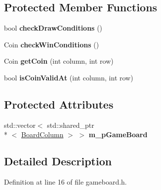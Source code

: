 \subsection*{Protected Member Functions}
\begin{DoxyCompactItemize}
\item 
\hypertarget{class_game_board_a9d39bb64647af701a265251624287807}{bool {\bfseries check\-Draw\-Conditions} ()}\label{class_game_board_a9d39bb64647af701a265251624287807}

\item 
\hypertarget{class_game_board_a2ac14f3ff1d653e086136792fe0933d6}{Coin {\bfseries check\-Win\-Conditions} ()}\label{class_game_board_a2ac14f3ff1d653e086136792fe0933d6}

\item 
\hypertarget{class_game_board_a15b19b2ec1e4c63b47e113aba42d3ae3}{Coin {\bfseries get\-Coin} (int column, int row)}\label{class_game_board_a15b19b2ec1e4c63b47e113aba42d3ae3}

\item 
\hypertarget{class_game_board_ae43c300f4bc9df8a8d65231f96d335dd}{bool {\bfseries is\-Coin\-Valid\-At} (int column, int row)}\label{class_game_board_ae43c300f4bc9df8a8d65231f96d335dd}

\end{DoxyCompactItemize}
\subsection*{Protected Attributes}
\begin{DoxyCompactItemize}
\item 
\hypertarget{class_game_board_a62a11c93b4a0af85d3613351ac323485}{std\-::vector$<$ std\-::shared\-\_\-ptr\\*
$<$ \hyperlink{class_board_column}{Board\-Column} $>$ $>$ {\bfseries m\-\_\-p\-Game\-Board}}\label{class_game_board_a62a11c93b4a0af85d3613351ac323485}

\end{DoxyCompactItemize}


\subsection{Detailed Description}


Definition at line 16 of file gameboard.\-h.




